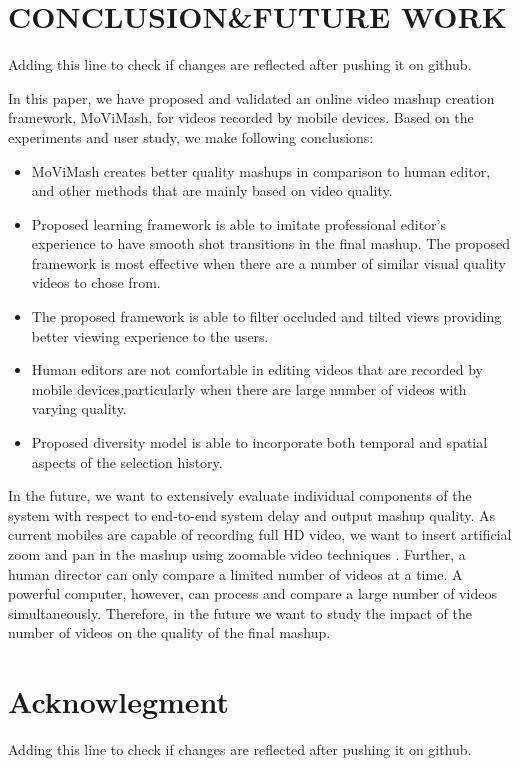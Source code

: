 \documentclass{sig-alternate}
\begin{document}
\section{CONCLUSION\&FUTURE WORK}

Adding this line to check if changes are reflected after pushing it on github.

In this paper, we have proposed and validated an online video mashup creation framework, MoViMash, for videos recorded by mobile devices. Based on the experiments and user study, we make following conclusions: 
\begin{itemize}
\item MoViMash creates better quality mashups in comparison to human editor, and other methods that are mainly based on video quality.
 \item Proposed learning framework is able to imitate professional editor’s experience to have smooth shot transitions in the ﬁnal mashup. The proposed framework is most effective when there are a number of similar visual quality videos to chose from. 
\item The proposed framework is able to ﬁlter occluded and tilted views providing better viewing experience to the users. 
\item Human editors are not comfortable in editing videos that are recorded by mobile devices,particularly when there are large number of videos with varying quality. 
\item Proposed diversity model is able to incorporate both temporal and spatial aspects of the selection history.
\end{itemize}
In the future, we want to extensively evaluate individual components of the system with respect to end-to-end system delay and output mashup quality. As current mobiles are capable of recording full HD video, we want to insert artiﬁcial zoom and pan in the mashup using zoomable video techniques \cite{saini2012movimash}. Further, a human director can only compare a limited number of videos at a time. A powerful computer, however, can process and compare a large number of videos simultaneously. Therefore, in the future we want to study the impact of the number of videos on \cite{saini2012movimash} the quality of the ﬁnal mashup.

\section*{Acknowlegment}

Adding this line to check if changes are reflected after pushing it on github.
\end{document}
